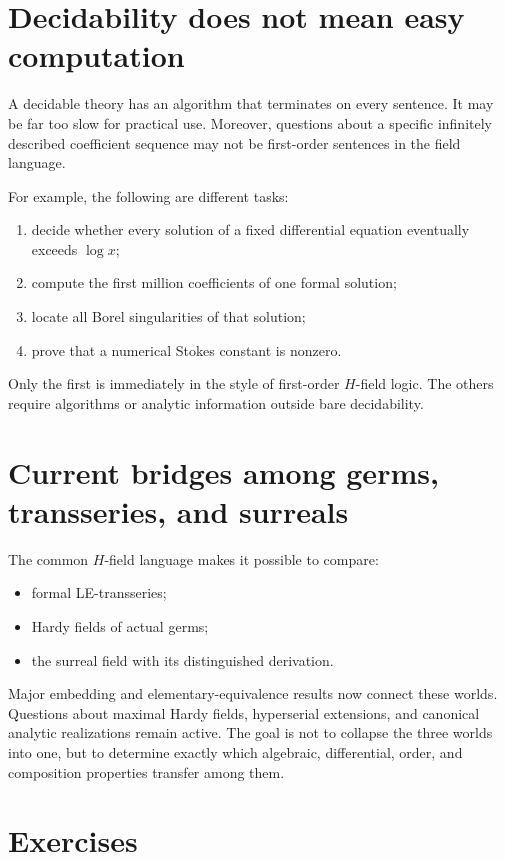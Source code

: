 \documentclass[11pt,openany]{book}
\theoremstyle{definition}
\theoremstyle{plain}
\theoremstyle{remark}
\begin{document}
\section{Decidability does not mean easy computation}

A decidable theory has an algorithm that terminates on every sentence. It may be far too slow for practical use. Moreover, questions about a specific infinitely described coefficient sequence may not be first-order sentences in the field language.

For example, the following are different tasks:
\begin{enumerate}
 \item decide whether every solution of a fixed differential equation eventually exceeds $\log x$;
 \item compute the first million coefficients of one formal solution;
 \item locate all Borel singularities of that solution;
 \item prove that a numerical Stokes constant is nonzero.
\end{enumerate}
Only the first is immediately in the style of first-order $H$-field logic. The others require algorithms or analytic information outside bare decidability.

\section{Current bridges among germs, transseries, and surreals}

The common $H$-field language makes it possible to compare:
\begin{itemize}
 \item formal LE-transseries;
 \item Hardy fields of actual germs;
 \item the surreal field with its distinguished derivation.
\end{itemize}
Major embedding and elementary-equivalence results now connect these worlds. Questions about maximal Hardy fields, hyperserial extensions, and canonical analytic realizations remain active. The goal is not to collapse the three worlds into one, but to determine exactly which algebraic, differential, order, and composition properties transfer among them.

\section{Exercises}
\end{document}
